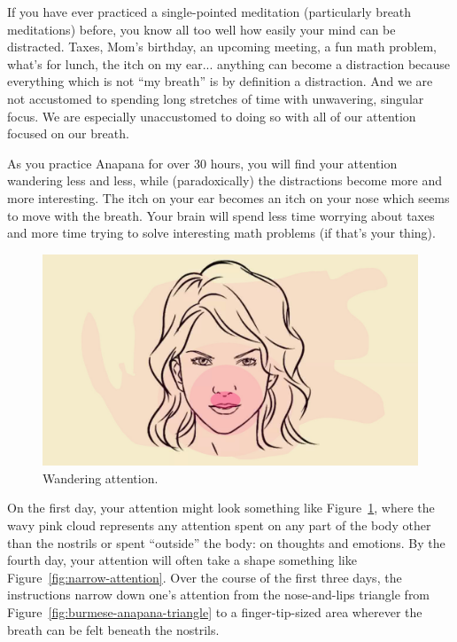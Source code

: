 \documentclass{article}
\begin{document}
If you have ever practiced a single-pointed meditation (particularly breath meditations) before, you know all too well how easily your mind can be distracted. Taxes, Mom's birthday, an upcoming meeting, a fun math problem, what's for lunch, the itch on my ear... anything can become a distraction because everything which is not ``my breath'' is by definition a distraction. And we are not accustomed to spending long stretches of time with unwavering, singular focus. We are especially unaccustomed to doing so with all of our attention focused on our breath.

As you practice Anapana for over 30 hours, you will find your attention wandering less and less, while (paradoxically) the distractions become more and more interesting. The itch on your ear becomes an itch on your nose which seems to move with the breath. Your brain will spend less time worrying about taxes and more time trying to solve interesting math problems (if that's your thing).

\begin{figure}[h]
  \centering
  \includegraphics[width=\linewidth]{images/face-attention.jpg}
  \caption{Wandering attention.}
  \label{fig:wandering-attention}
\end{figure}

On the first day, your attention might look something like Figure~\ref{fig:wandering-attention}, where the wavy pink cloud represents any attention spent on any part of the body other than the nostrils or spent ``outside'' the body: on thoughts and emotions. By the fourth day, your attention will often take a shape something like Figure~\ref{fig:narrow-attention}. Over the course of the first three days, the instructions narrow down one's attention from the nose-and-lips triangle from Figure~\ref{fig:burmese-anapana-triangle} to a finger-tip-sized area wherever the breath can be felt beneath the nostrils.
\end{document}
